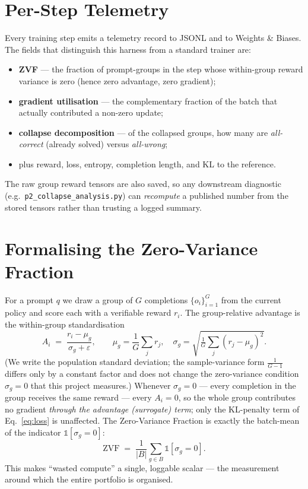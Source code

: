 \documentclass[12pt,a4paper]{report}
\newcommand{\zvf}{\mathrm{ZVF}}
\begin{document}
\section{Per-Step Telemetry}
\label{sec:telemetry}
Every training step emits a telemetry record to JSONL and to Weights \& Biases. The
fields that distinguish this harness from a standard trainer are:
\begin{itemize}[leftmargin=1.4em,itemsep=1pt]
  \item \textbf{ZVF} --- the fraction of prompt-groups in the step whose within-group
  reward variance is zero (hence zero advantage, zero gradient);
  \item \textbf{gradient utilisation} --- the complementary fraction of the batch
  that actually contributed a non-zero update;
  \item \textbf{collapse decomposition} --- of the collapsed groups, how many are
  \emph{all-correct} (already solved) versus \emph{all-wrong};
  \item plus reward, loss, entropy, completion length, and KL to the reference.
\end{itemize}
The raw group reward tensors are also saved, so any downstream diagnostic (e.g.\
\texttt{p2\_collapse\_analysis.py}) can \emph{recompute} a published number from the
stored tensors rather than trusting a logged summary.

\section{Formalising the Zero-Variance Fraction}
For a prompt $q$ we draw a group of $G$ completions $\{o_i\}_{i=1}^{G}$ from the
current policy and score each with a verifiable reward $r_i$. The group-relative
advantage is the within-group standardisation
\begin{equation}
A_i \;=\; \frac{r_i - \mu_g}{\sigma_g + \varepsilon},
\qquad
\mu_g = \frac{1}{G}\sum_{j} r_j,\quad
\sigma_g = \sqrt{\tfrac{1}{G}\sum_j (r_j-\mu_g)^2}.
\label{eq:adv}
\end{equation}
(We write the population standard deviation; the sample-variance form $\tfrac{1}{G-1}$
differs only by a constant factor and does not change the zero-variance condition
$\sigma_g=0$ that this project measures.) Whenever $\sigma_g = 0$ --- every completion in the group receives the same reward ---
every $A_i = 0$, so the whole group contributes no gradient \emph{through the
advantage (surrogate) term}; only the KL-penalty term of Eq.~\eqref{eq:loss} is
unaffected. The Zero-Variance
Fraction is exactly the batch-mean of the indicator $\mathbb{1}[\sigma_g = 0]$:
\begin{equation}
\zvf \;=\; \frac{1}{|B|}\sum_{g \in B} \mathbb{1}\!\left[\sigma_g = 0\right].
\label{eq:zvf}
\end{equation}
This makes ``wasted compute'' a single, loggable scalar --- the measurement around
which the entire portfolio is organised.
\end{document}
